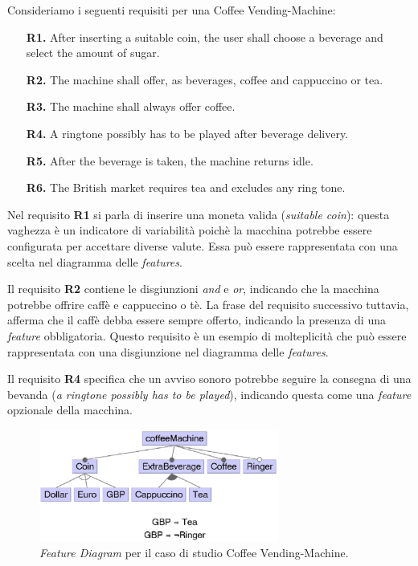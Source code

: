 \documentclass[12pt]{report}
\begin{document}
\begin{mdframed}
\small
Consideriamo i seguenti requisiti per una \textsf{Coffee Vending-Machine}:
\begin{itemize}[itemsep=0pt]
\item[\textbf{R1.}] After inserting a suitable coin, the user shall choose a beverage and select the amount of sugar.
\item[\textbf{R2.}] The machine shall offer, as beverages, coffee and cappuccino or tea.
\item[\textbf{R3.}] The machine shall always offer coffee.
\item[\textbf{R4.}] A ringtone possibly has to be played after beverage delivery.
\item[\textbf{R5.}] After the beverage is taken, the machine returns idle.
\item[\textbf{R6.}] The British market requires tea and excludes any ring tone.
\end{itemize}
\end{mdframed}

Nel requisito \textbf{R1} si parla di inserire una moneta valida (\textit{suitable coin}): questa \textsf{vaghezza} è un indicatore di variabilità poichè la macchina potrebbe essere configurata per accettare diverse valute. Essa può essere rappresentata con una scelta nel diagramma delle \textit{features}.

Il requisito \textbf{R2} contiene le disgiunzioni \textit{and} e \textit{or}, indicando che la macchina potrebbe offrire caffè e cappuccino o tè. La frase del requisito successivo tuttavia, afferma che il caffè debba essere sempre offerto, indicando la presenza di una \textit{feature} obbligatoria. Questo requisito è un esempio di \textsf{molteplicità} che può essere rappresentata con una disgiunzione nel diagramma delle \textit{features}.

Il requisito \textbf{R4} specifica che un avviso sonoro potrebbe seguire la consegna di una bevanda (\textit{a ringtone possibly has to be played}), indicando questa come una \textit{feature} opzionale della macchina.

\begin{figure}[H]
\centering
\includegraphics[width=0.7\textwidth]{coffee.png}
\caption{\textit{Feature Diagram} per il caso di studio \textsf{Coffee Vending-Machine}.}
\label{fig:coffee}
\end{figure}
\end{document}
